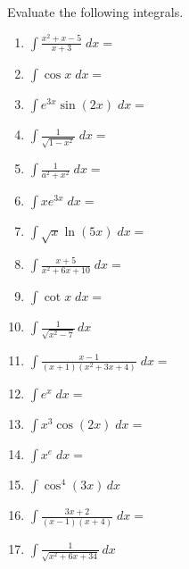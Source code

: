 \documentclass{exam}[12pt]
\begin{document}
\pagestyle{head}



\vspace{.2in}
\large{
Evaluate the following integrals.
\begin{enumerate}
\item $\displaystyle \int  \frac{x^2 + x -5}{x + 3}     \; dx = $
\vspace{.2in}
\item   $\displaystyle \int \cos x \; dx = $
\vspace{.2in}
\item $\displaystyle \int e^{3x}\sin(2x)\; dx = $
\vspace{.2in}
\item $\displaystyle \int \frac{1}{\sqrt{1-x^2}} \; dx = $ 
\vspace{.2in}
\item $\displaystyle \int \frac{1}{a^2+x^2}\; dx = $
\vspace{.2in}

\item $\displaystyle \int  x e^{3x} \; dx = $
\vspace{.2in}


\item $\displaystyle \int \sqrt{x} \ln(5x)\; dx = $
\vspace{.2in}
\item $\displaystyle \int   \frac{x+5}{x^2+6x+10}    \; dx = $
\vspace{.2in}
\item $\displaystyle \int \cot x \; dx = $
\vspace{.2in}
\item $\displaystyle \int \frac{1}{\sqrt{x^2 - 7}}   \, dx$
\vspace{.2in}
\item $\displaystyle \int \frac{x-1}{(x+1)(x^2+3x+4)}\; dx =$
\vspace{.2in}
\item $\displaystyle \int e^x \; dx = $
\vspace{.2in}
\item $\displaystyle \int x^3 \cos(2x)\; dx = $
\vspace{.2in}
\item $\displaystyle \int x^e \; dx = $
\vspace{.2in}
\item $\displaystyle \int \cos^4(3x) \, dx$
\vspace{.2in}
\item $\displaystyle \int  \frac{3x+2}{(x-1)(x+4)}  \; dx = $
\vspace{.2in}
\item $\displaystyle \int \frac{1}{\sqrt{x^2 +6x + 34}}   \, dx$
\vspace{.2in}



\end{enumerate}}
\end{document}
